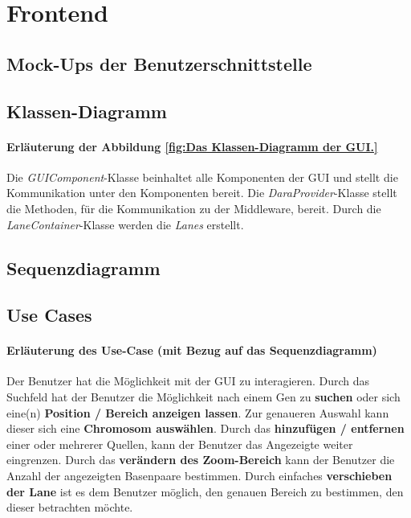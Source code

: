 \section{Frontend}
\subsection{Mock-Ups der Benutzerschnittstelle}
\subsection{Klassen-Diagramm}
\paragraph{Erläuterung der Abbildung \ref{fig:Das Klassen-Diagramm der GUI.}}
Die \textit{GUIComponent}-Klasse beinhaltet alle Komponenten der GUI und stellt die Kommunikation unter den Komponenten bereit. Die \textit{DaraProvider}-Klasse stellt die Methoden, für die Kommunikation zu der Middleware, bereit. Durch die \textit{LaneContainer}-Klasse werden die \textit{Lanes} erstellt. 
\subsection{Sequenzdiagramm}
\subsection{Use Cases}
\paragraph{Erläuterung des Use-Case (mit Bezug auf das Sequenzdiagramm)}
Der Benutzer hat die Möglichkeit mit der GUI zu interagieren. Durch das Suchfeld hat der Benutzer die Möglichkeit nach einem Gen zu \textbf{suchen} oder sich eine(n) \textbf{Position / Bereich anzeigen lassen}. Zur genaueren Auswahl kann dieser sich eine \textbf{Chromosom auswählen}. Durch das \textbf{hinzufügen / entfernen} einer oder mehrerer Quellen, kann der Benutzer das Angezeigte weiter eingrenzen. Durch das \textbf{verändern des Zoom-Bereich} kann der Benutzer die Anzahl der angezeigten Basenpaare bestimmen. Durch einfaches \textbf{verschieben der Lane} ist es dem Benutzer möglich, den genauen Bereich zu bestimmen, den dieser betrachten möchte.

